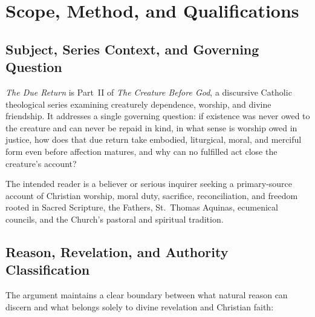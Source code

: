 \section{Scope, Method, and Qualifications}

\subsection*{Subject, Series Context, and Governing Question}

\emph{The Due Return} is Part~II of \emph{The Creature Before God}, a discursive Catholic theological series examining creaturely dependence, worship, and divine friendship. It addresses a single governing question: if existence was never owed to the creature and can never be repaid in kind, in what sense is worship owed in justice, how does that due return take embodied, liturgical, moral, and merciful form even before affection matures, and why can no fulfilled act close the creature's account?

The intended reader is a believer or serious inquirer seeking a primary-source account of Christian worship, moral duty, sacrifice, reconciliation, and freedom rooted in Sacred Scripture, the Fathers, St.\ Thomas Aquinas, ecumenical councils, and the Church's pastoral and spiritual tradition.

\subsection*{Reason, Revelation, and Authority Classification}

The argument maintains a clear boundary between what natural reason can discern and what belongs solely to divine revelation and Christian faith:

